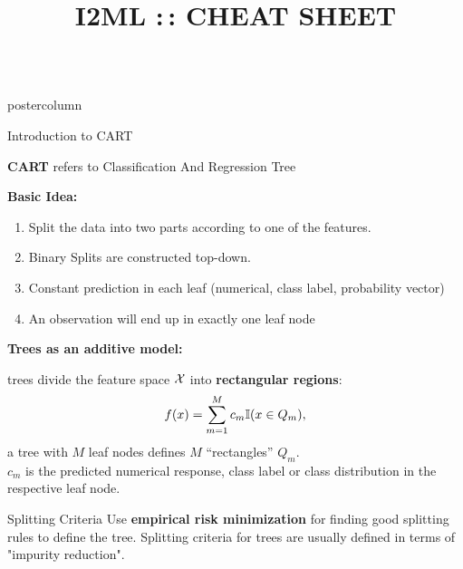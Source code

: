 \documentclass{beamer}
\title{I2ML :\,: CHEAT SHEET} %
\newlength{\columnheight} %
\begin{document}
\begin{frame}[fragile]{}
\begin{columns}
	\begin{column}{.31\textwidth}
		\begin{beamercolorbox}[center]{postercolumn}
			\begin{minipage}{.98\textwidth}
				\parbox[t][\columnheight]{\textwidth}{
					\begin{myblock}{Introduction to CART}
						\begin{codebox}
							\textbf{CART} refers to Classification And Regression Tree
						\end{codebox}
					    \hspace*{1ex}
						\begin{codebox}
							\textbf{Basic Idea:}
						\end{codebox}
						\begin{enumerate}
                        \item Split the data into two parts according to one of the features.
                        \item Binary Splits are constructed top-down.
                        \item Constant prediction in each leaf (numerical, class label, probability vector)
                        \item An observation will end up in exactly one leaf node
                        \end{enumerate}
						\hspace*{1ex}
				
						\begin{codebox}
							 \textbf{Trees as an additive model: }
						\end{codebox}
						trees divide the feature space $\mathcal{X}$ into \textbf{rectangular regions}:
					\begin{align*}
                    f(x) = \sum_{m=1}^M c_m \mathbb{I}(x \in Q_m),
                    \end{align*}
					a tree with $M$ leaf nodes defines $M$ \enquote{rectangles} $Q_m$.\\
                    $c_m$ is the predicted numerical response, class label or class distribution in the respective leaf node.
					\end{myblock}
					\begin{myblock}{Splitting Criteria}
					Use \textbf{empirical risk minimization} for finding good splitting rules to define the tree. Splitting criteria for trees are usually defined in terms of "impurity reduction".\\
					

\end{myblock}}
\end{minipage}
\end{beamercolorbox}
\end{column}
\end{columns}
\end{frame}
\end{document}
